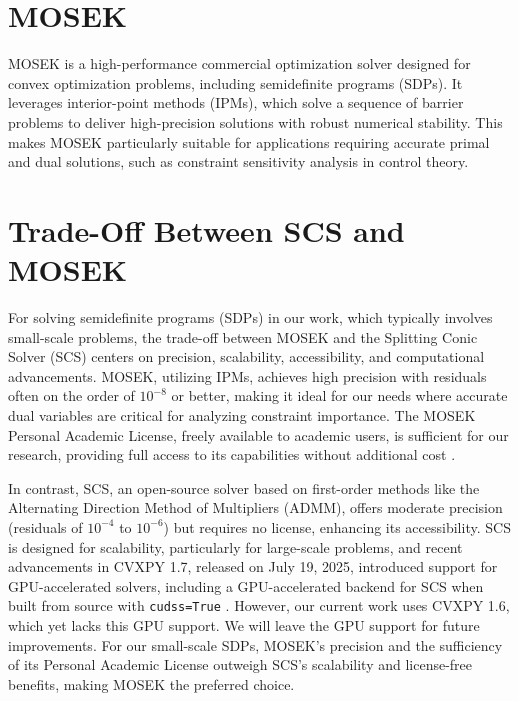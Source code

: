 \section{MOSEK}
MOSEK \cite{mosek} is a high-performance commercial optimization solver designed for convex
optimization problems, including semidefinite programs (SDPs).
It leverages interior-point methods (IPMs), which solve a sequence of barrier
problems to deliver high-precision solutions with robust numerical stability.
This makes MOSEK particularly suitable for applications requiring accurate
primal and dual solutions, such as constraint sensitivity analysis in control theory.

\section{Trade-Off Between SCS and MOSEK}
For solving semidefinite programs (SDPs) in our work, which typically involves
small-scale problems, the trade-off between MOSEK and the Splitting Conic Solver
(SCS) centers on precision, scalability, accessibility, and computational advancements.
MOSEK, utilizing IPMs, achieves high precision with residuals often on the order
of $10^{-8}$ or better, making it ideal for our needs where accurate dual
variables are critical for analyzing constraint importance.
The MOSEK Personal Academic License, freely available to academic users, is
sufficient for our research, providing full access to its capabilities without
additional cost \cite{mosek_academic}.

In contrast, SCS, an open-source solver based on first-order methods like the
Alternating Direction Method of Multipliers (ADMM), offers moderate precision
(residuals of $10^{-4}$ to $10^{-6}$) but requires no license, enhancing its
accessibility.
SCS is designed for scalability, particularly for large-scale problems, and
recent advancements in CVXPY 1.7, released on July 19, 2025, introduced support
for GPU-accelerated solvers, including a GPU-accelerated backend for SCS when
built from source with \texttt{cudss=True} \cite{cvxpy_1_7}.
However, our current work uses CVXPY 1.6, which yet lacks this GPU support.
We will leave the GPU support for future improvements.
For our small-scale SDPs, MOSEK's precision and the sufficiency of its
Personal Academic License outweigh SCS's scalability and license-free benefits,
making MOSEK the preferred choice.
